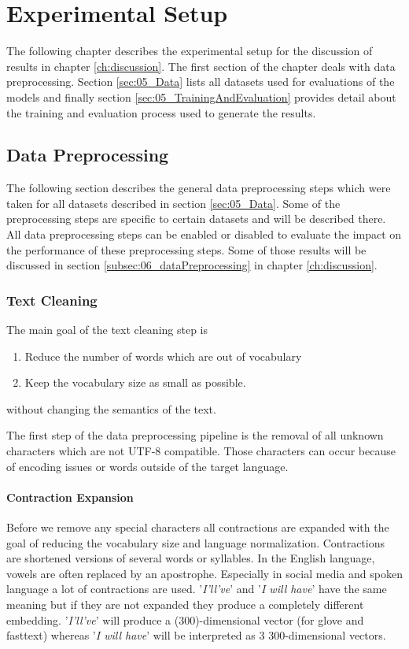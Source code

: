 \chapter{Experimental Setup}
\label{ch:setup}

The following chapter describes the experimental setup for the discussion of results in chapter \ref{ch:discussion}. The first section of the chapter deals with data preprocessing. Section \ref{sec:05_Data} lists all datasets used for evaluations of the models and finally section \ref{sec:05_TrainingAndEvaluation} provides detail about the training and evaluation process used to generate the results.

\section{Data Preprocessing}
The following section describes the general data preprocessing steps which were taken for all datasets described in section \ref{sec:05_Data}. Some of the preprocessing steps are specific to certain datasets and will be described there. All data preprocessing steps can be enabled or disabled to evaluate the impact on the performance of these preprocessing steps. Some of those results will be discussed in section \ref{subsec:06_dataPreprocessing} in chapter \ref{ch:discussion}.

\subsection{Text Cleaning}
The main goal of the text cleaning step is 
\begin{enumerate}
	\item Reduce the number of words which are out of vocabulary
	\item Keep the vocabulary size as small as possible.
\end{enumerate}

without changing the semantics of the text.


The first step of the data preprocessing pipeline is the removal of all unknown characters which are not UTF-8 compatible. Those characters can occur because of encoding issues or words outside of the target language. 
\subsubsection*{Contraction Expansion}

Before we remove any special characters all contractions are expanded with the goal of reducing the vocabulary size and language normalization. Contractions are shortened versions of several words or syllables. In the English language, vowels are often replaced by an apostrophe.  Especially in social media and spoken language a lot of contractions are used. '\textit{I'll've}' and '\textit{I will have}' have the same meaning but if they are not expanded they produce a completely different embedding. '\textit{I'll've}' will produce a (300)-dimensional vector (for glove and fasttext) whereas '\textit{I will have}' will be interpreted as 3 300-dimensional vectors.
\medskip


